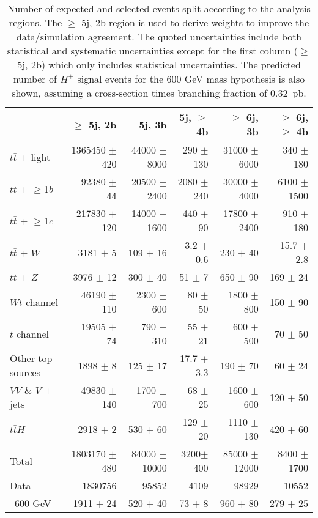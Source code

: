 \begin{table}[htb]
    \centering
    \begin{tabular}{l r r r r r}
        \toprule\toprule
          & $\geq$ 5j, 2b & {5j, 3b} & {5j, $\geq$ 4b} & {$\geq$ 6j, 3b} & {$\geq$ 6j, $\geq$ 4b}\\
          \midrule 
  $t\bar{t}$ + light        & 1365450 $\pm$ 420 & 44000 $\pm$ 8000  & 290 $\pm$ 130  & 31000 $\pm$ 6000  & 340 $\pm$ 180 \\ 
  $t\bar{t}$ + $\geq$1$b$   & 92380   $\pm$ 44 & 20500  $\pm$ 2400  & 2080 $\pm$ 240 & 30000 $\pm$ 4000  & 6100 $\pm$ 1500   \\ 
  $t\bar{t}$ + $\geq$1$c$   & 217830  $\pm$ 120 & 14000 $\pm$ 1600  & 440 $\pm$ 90   & 17800 $\pm$ 2400  & 910  $\pm$ 180   \\ 
  $t\bar{t}$ + $W$          & 3181    $\pm$ 5   & 109   $\pm$ 16    & 3.2 $\pm$ 0.6  & 230   $\pm$ 40    & 15.7   $\pm$ 2.8 \\ 
  $t\bar{t}$ + $Z$          & 3976    $\pm$ 12  & 300   $\pm$ 40    & 51  $\pm$ 7    & 650   $\pm$ 90    & 169  $\pm$ 24 \\ 
  $Wt$ channel              & 46190   $\pm$ 110 & 2300  $\pm$ 600   & 80  $\pm$ 50   & 1800  $\pm$ 800   & 150  $\pm$ 90 \\ 
  $t$ channel               & 19505   $\pm$ 74  & 790   $\pm$ 310   & 55  $\pm$ 21   & 600   $\pm$ 500   & 70   $\pm$ 50 \\ 
  Other top sources         & 1898    $\pm$ 8   & 125   $\pm$ 17    & 17.7  $\pm$ 3.3    & 190   $\pm$ 70    & 60   $\pm$ 24 \\ 
  $VV$ \& $V$ + jets        & 49830   $\pm$ 140 & 1700  $\pm$ 700   & 68  $\pm$ 25   & 1600  $\pm$ 600   & 120  $\pm$ 50 \\ 
  $t\bar{t}H$               & 2918    $\pm$ 2   & 530   $\pm$ 60    & 129 $\pm$ 20   & 1110  $\pm$ 130   & 420  $\pm$ 60 \\ 
\midrule      
  Total                     &1803170 $\pm$ 480 & 84000 $\pm$ 10000 & 3200$\pm$ 400 & 85000 $\pm$ 12000 & 8400 $\pm$ 1700 \\
\midrule
  Data                      &1830756           & 95852             & 4109          & 98929          & 10552 \\
\midrule  
\midrule\ 600 GeV             & 1911 $\pm$ 24   & 520 $\pm$ 40      & 73 $\pm$ 8    & 960 $\pm$ 80   & 279 $\pm$ 25  \\   
\bottomrule\bottomrule                               
    \end{tabular}
    \caption{Number of expected and selected events split according to the analysis regions. The $\geq$ 5j, 2b region is used to derive weights to improve the data/simulation agreement. The quoted uncertainties include both statistical and systematic uncertainties except for the first column ($\geq$ 5j, 2b) which only includes statistical uncertainties. The predicted number of $H^+$ signal events for the 600 GeV mass hypothesis is also shown, assuming a cross-section times branching fraction of 0.32~pb.}
    \label{Hplustb:prefityields}
\end{table}

